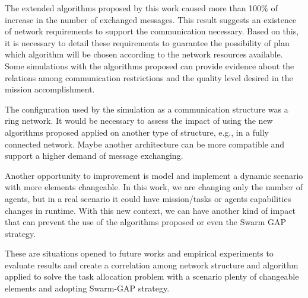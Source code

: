 The extended algorithms proposed by this work caused more than 100\% of increase in the number of exchanged messages. This result suggests an existence of network requirements to support the communication necessary. Based on this, it is necessary to detail these requirements to guarantee the possibility of plan which algorithm will be chosen according to the network resources available. Some simulations with the algorithms proposed can provide evidence about the relations among communication restrictions and the quality level desired in the mission accomplishment.

The configuration used by the simulation as a communication structure was a ring network. It would be necessary to assess the impact of using the new algorithms proposed applied on another type of structure, e.g., in a fully connected network. Maybe another architecture can be more compatible and support a higher demand of message exchanging.

Another opportunity to improvement is model and implement a dynamic scenario with more elements changeable. In this work, we are changing only the number of agents, but in a real scenario it could have mission/tasks or agents capabilities changes in runtime. With this new context, we can have another kind of impact that can prevent the use of the algorithms proposed or even the Swarm GAP strategy.

These are situations opened to future works and empirical experiments to evaluate results and create a correlation among network structure and algorithm applied to solve the task allocation problem with a scenario plenty of changeable elements and adopting Swarm-GAP strategy.
